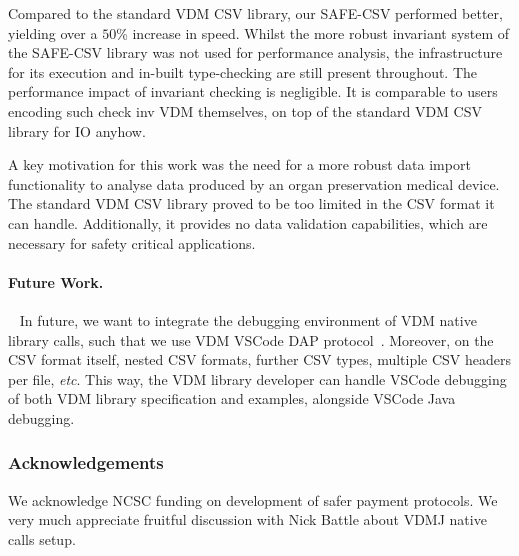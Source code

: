 \documentclass[runningheads,a4paper]{llncs}
\begin{document}
Compared to the standard VDM CSV library, our SAFE-CSV performed better, yielding over a \(50\)\% increase in speed. Whilst the more robust invariant system of the SAFE-CSV library was not used for performance analysis, the infrastructure for its execution and in-built type-checking are still present throughout. The performance impact of invariant checking is negligible. It is comparable to users encoding such check inv VDM themselves, on top of the standard VDM CSV library for IO anyhow.  

A key motivation for this work was the need for a more robust data import functionality to analyse data produced by an organ preservation medical device. The standard VDM CSV library proved to be too limited in the CSV format it can handle. Additionally, it provides no data validation capabilities, which are necessary for safety critical applications. 

\paragraph*{Future Work.}~
%
In future, we want to integrate the debugging environment of VDM native library calls, such that we use VDM VSCode DAP protocol~\cite{AdvancedVSCodePaper}. Moreover, on the CSV format itself, nested CSV formats, further CSV types, multiple CSV headers per file, \textit{etc}. This way, the VDM library developer can handle VSCode debugging of both VDM library specification and examples, alongside VSCode Java debugging. 

\subsubsection*{Acknowledgements}
We acknowledge NCSC funding on development of safer payment protocols. We very much appreciate fruitful discussion with Nick Battle about VDMJ native calls setup. 




\end{document}
